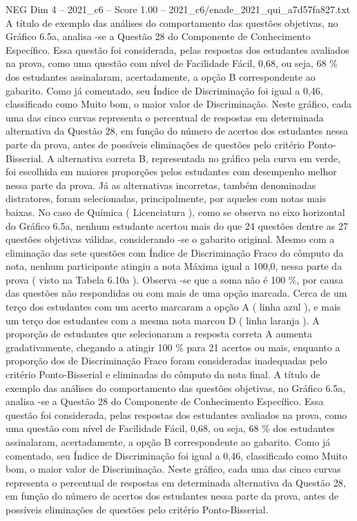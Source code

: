 \begin{textsample}{NEG Dim 4 – 2021\_c6 – Score 1.00 – 2021\_c6/enade\_2021\_qui\_a7d57fa827.txt}
A título de exemplo das análises do comportamento das questões objetivas, no Gráfico 6.5a, analisa -se a Questão 28 do Componente de Conhecimento Específico.
Essa questão foi considerada, pelas respostas dos estudantes avaliados na prova, como uma questão com nível de Facilidade Fácil, 0,68, ou seja, 68 \% dos estudantes assinalaram, acertadamente, a opção B correspondente ao gabarito.
Como já comentado, seu Índice de Discriminação foi igual a 0,46, classificado como Muito bom, o maior valor de Discriminação.
Neste gráfico, cada uma das cinco curvas representa o percentual de respostas em determinada alternativa da Questão 28, em função do número de acertos dos estudantes nessa parte da prova, antes de possíveis eliminações de questões pelo critério Ponto-Bisserial.
A alternativa correta B, representada no gráfico pela curva em verde, foi escolhida em maiores proporções pelos estudantes com desempenho melhor nessa parte da prova.
Já as alternativas incorretas, também denominadas distratores, foram selecionadas, principalmente, por aqueles com notas mais baixas.
No caso de Química ( Licenciatura ), como se observa no eixo horizontal do Gráfico 6.5a, nenhum estudante acertou mais do que 24 questões dentre as 27 questões objetivas válidas, considerando -se o gabarito original.
Mesmo com a eliminação das sete questões com Índice de Discriminação Fraco do cômputo da nota, nenhum participante atingiu a nota Máxima igual a 100,0, nessa parte da prova ( visto na Tabela 6.10a ).
Observa -se que a soma não é 100 \%, por causa das questões não respondidas ou com mais de uma opção marcada.
Cerca de um terço dos estudantes com um acerto marcaram a opção A ( linha azul ), e mais um terço dos estudantes com a mesma nota marcou D ( linha laranja ).
A proporção de estudantes que selecionaram a resposta correta A aumenta gradativamente, chegando a atingir 100 \% para 21 acertos ou mais, enquanto a proporção dos de Discriminação Fraco foram consideradas inadequadas pelo critério Ponto-Bisserial e eliminadas do cômputo da nota final.
A título de exemplo das análises do comportamento das questões objetivas, no Gráfico 6.5a, analisa -se a Questão 28 do Componente de Conhecimento Específico.
Essa questão foi considerada, pelas respostas dos estudantes avaliados na prova, como uma questão com nível de Facilidade Fácil, 0,68, ou seja, 68 \% dos estudantes assinalaram, acertadamente, a opção B correspondente ao gabarito.
Como já comentado, seu Índice de Discriminação foi igual a 0,46, classificado como Muito bom, o maior valor de Discriminação.
Neste gráfico, cada uma das cinco curvas representa o percentual de respostas em determinada alternativa da Questão 28, em função do número de acertos dos estudantes nessa parte da prova, antes de possíveis eliminações de questões pelo critério Ponto-Bisserial.

\end{textsample}
